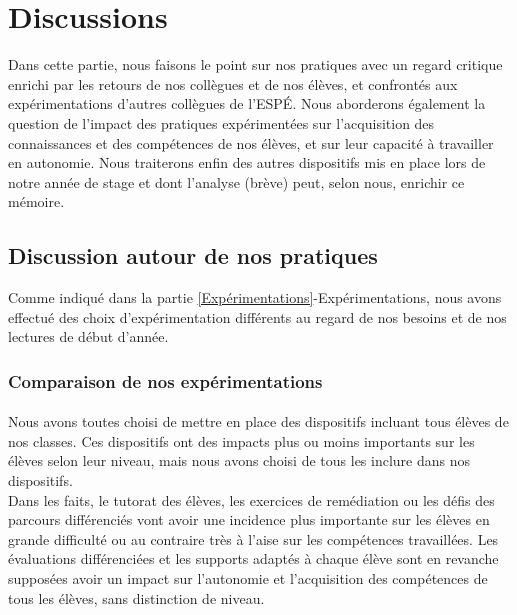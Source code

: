 \section{Discussions}
Dans cette partie, nous faisons le point sur nos pratiques avec un regard critique enrichi par les retours de nos collègues et de nos élèves, et confrontés aux expérimentations d'autres collègues de l'ESPÉ. Nous aborderons également la question de l'impact des pratiques expérimentées sur l'acquisition des connaissances et des compétences de nos élèves, et sur leur capacité à travailler en autonomie. Nous traiterons enfin des autres dispositifs mis en place lors de notre année de stage et dont l'analyse (brève) peut, selon nous, enrichir ce mémoire.
\subsection{Discussion autour de nos pratiques}
Comme indiqué dans la partie \ref{Expérimentations}-Expérimentations, nous avons effectué des choix d'expérimentation différents au regard de nos besoins et de nos lectures de début d'année.\\

\subsubsection{Comparaison de nos expérimentations}
\paragraph*{}Nous avons toutes choisi de mettre en place des dispositifs incluant tous élèves de nos classes. Ces dispositifs ont des impacts plus ou moins importants sur les élèves selon leur niveau, mais nous avons choisi de tous les inclure dans nos dispositifs.\\
Dans les faits, le tutorat des élèves, les exercices de remédiation ou les défis des parcours différenciés vont avoir une incidence plus importante sur les élèves en grande difficulté ou au contraire très à l'aise sur les compétences travaillées. Les évaluations différenciées et les supports adaptés à chaque élève sont en revanche supposées avoir un impact sur l'autonomie et l'acquisition des compétences de tous les élèves, sans distinction de niveau.\\
